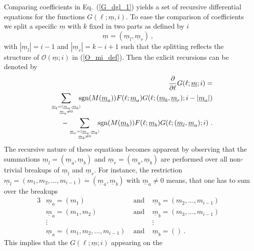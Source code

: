 Comparing coefficients in Eq.~(\ref{G_dgl_1}) yields  a set of
recursive differential  equations for  the functions
$G(\ell;{\underline m},i)$.  To ease the comparison of coefficients
we split a specific $\underline m$ with $k$
fixed in two parts as defined by $i$
\begin{equation}
  \label{m_split}
  {\underline m}=({\underline m}_l,{\underline m}_r)\ ,
\end{equation}
with $|{\underline m}_l|=i-1$ and $|{\underline m}_r|=k-i+1$
such that the splitting reflects the structure of 
 ${\mathcal O}({\underline m};i)$ in (\ref{O_mi_def}).
Then the exlicit recursions can be denoted by
\begin{eqnarray}
  \nonumber
  && \frac{\partial}{\partial \ell} G(\ell;{\underline m};i)=\\\nonumber
  && \sum_{{\underline m}_l=({\underline m}_a,{\underline m}_b)
        \atop {\underline m}_a\not=0} \hspace{-2mm} \mbox{sgn}(M({\underline
  m}_a))F(\ell;{\underline m}_a) G(\ell;({\underline m}_b,{\underline
  m}_r);i-|{\underline  m}_a|)\\
  &&- \sum_{{\underline m}_r=({\underline m}_a,{\underline m}_b)
        \atop {\underline m}_b\not=0} \hspace{-2mm} \mbox{sgn}(M({\underline
        m}_b))F(\ell;{\underline m}_b)
   G(\ell;({\underline m}_l,{\underline m}_a);i)\ .\label{G_dgl_2}
\end{eqnarray}
The recursive nature of these equations becomes apparent by observing
that the summations ${\underline m}_l=({\underline m}_a,{\underline
  m}_b)$ and ${\underline m}_r=({\underline m}_a,{\underline m}_b)$
are performed over all non-trivial breakups of ${\underline
  m}_l$ and ${\underline m}_r$. For instance, the restriction ${\underline
  m}_l=(m_1,m_2,\ldots,m_{i-1})\dot=({\underline m}_a,{\underline m}_b)$
with ${\underline m}_a\not =0$ means, that one has to sum over the breakups
\begin{alignat}{3}
  \nonumber
  &{\underline m}_a=(m_1) & \mbox{ \ and \ } &{\underline
    m}_b=(m_2,\ldots,m_{i-1})\\\nonumber 
  &{\underline m}_a=(m_1,m_2) & \mbox{ \ and \ } &{\underline
    m}_b=(m_3,\ldots,m_{i-1})\\\nonumber
  &\vdots  & &\vdots \\\label{m_break_2}
  &{\underline m}_a=(m_1,m_2,\ldots,m_{i-1}) & \mbox{ \ and \ } &{\underline
    m}_b=()\ .
\end{alignat}
This implies that the $G(\ell;{\underline m};i)$ appearing on the
